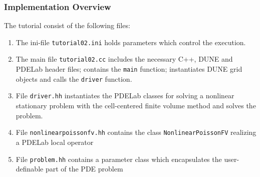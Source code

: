 \documentclass[aspectratio=169,11pt]{beamer}
\theoremstyle{definition}
\begin{document}
\begin{frame}
\frametitle{Implementation Overview}
The tutorial consist of the following files:
\begin{enumerate}[1)]
\item The ini-file
\lstinline{tutorial02.ini} holds parameters
which control the execution.
\item The main file \lstinline{tutorial02.cc} includes the necessary C++,
DUNE and PDELab header files;
contains the \lstinline{main} function;
instantiates DUNE grid objects and calls the \lstinline{driver} function.
\item File \lstinline{driver.hh} instantiates the PDELab classes
for solving a nonlinear stationary problem with the cell-centered finite
volume method and solves the problem.
\item File \lstinline{nonlinearpoissonfv.hh} contains the class
\lstinline{NonlinearPoissonFV} realizing a PDELab local operator
\item File \lstinline{problem.hh} contains a parameter class which
encapsulates the user-definable part of the PDE problem
\end{enumerate}
\end{frame}
\end{document}
